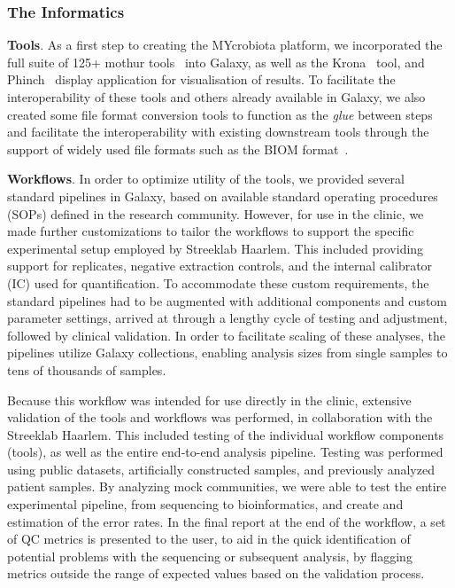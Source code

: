 \subsubsection{The Informatics}

\textbf{Tools}. As a first step to creating the MYcrobiota platform, we incorporated the full suite of 125+ mothur tools~\cite{schloss} into Galaxy, as well as the Krona~\cite{ondov2015krona} tool, and Phinch~\cite{bik2014phinch} display application for visualisation of results. To facilitate the interoperability of these tools and others already available in Galaxy, we also created some file format conversion tools to function as the \emph{glue} between steps and facilitate the interoperability with existing downstream tools through the support of widely used file formats such as the BIOM format~\cite{mcdonald2012biological}.


\textbf{Workflows}. In order to optimize utility of the tools, we provided several standard pipelines in Galaxy, based on available standard operating procedures (SOPs) defined in the research community.
However, for use in the clinic, we made further customizations to tailor the workflows to support the specific experimental setup employed by Streeklab Haarlem. This included providing support for replicates, negative extraction controls, and the internal calibrator (IC) used for quantification.
To accommodate these custom requirements, the standard pipelines had to be augmented with additional components and custom parameter settings, arrived at through a lengthy cycle of testing and adjustment, followed by clinical validation.
In order to facilitate scaling of these analyses, the pipelines utilize Galaxy collections, enabling analysis sizes from single samples to tens of thousands of samples.

Because this workflow was intended for use directly in the clinic, extensive validation of the tools and workflows was performed, in collaboration with the Streeklab Haarlem. This included testing of the individual workflow components (tools), as well as the entire end-to-end analysis pipeline. Testing was performed using public datasets, artificially constructed samples, and previously analyzed patient samples. By analyzing mock communities, we were able to test the entire experimental pipeline, from sequencing to bioinformatics, and create and estimation of the error rates. In the final report at the end of the workflow, a set of QC metrics is presented to the user, to aid in the quick identification of potential problems with the sequencing or subsequent analysis, by flagging metrics outside the range of expected values based on the validation process.

